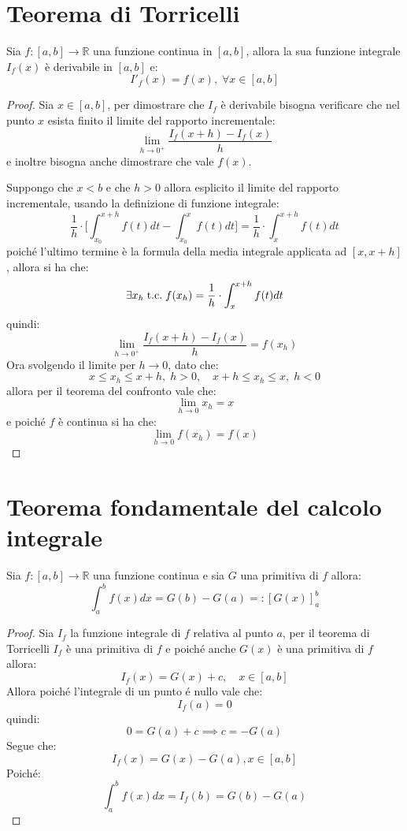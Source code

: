 \documentclass[a4paper,12pt,openright]{book}
\begin{document}
	\newpage
	
	\section{Teorema di Torricelli}
	Sia $f: [a, b] \longrightarrow \mathbb{R}$ una funzione continua in $[a, b]$, allora la sua funzione integrale $I_f(x)$ è derivabile in $[a, b]$ e:
	\[I'_f(x) = f(x), \; \forall x \in [a, b]\]
	
	\begin{proof}
		Sia $x \in [a, b]$, per dimostrare che $I_f$ è derivabile bisogna verificare che nel punto $x$ esista finito il limite del rapporto incrementale:
		\[\lim_{h \to 0^+} \frac{I_f(x + h) - I_f(x)}{h}\]
		e inoltre bisogna anche dimostrare che vale $f(x)$.
		
		Suppongo che $x < b$ e che $h > 0$ allora esplicito il limite del rapporto incrementale, usando la definizione di funzione integrale:
		\[\frac{1}{h} \cdot \big[\int_{x_0}^{x + h} f(t)dt - \int_{x_0}^{x} f(t)dt\big] = \frac{1}{h} \cdot \int_{x}^{x + h} f(t)dt\]
		poiché l'ultimo termine è la formula della media integrale applicata ad $[x, x + h]$, allora si ha che:
		\[\exists x_h \;\text{t.c.}\; f(x_h) = \frac{1}{h} \cdot \int_{x}^{x + h} f(t)dt\]
		quindi:
		\[\lim_{h \to 0^+} \frac{I_f(x + h) - I_f(x)}{h} = f(x_h)\]
		Ora svolgendo il limite per $h \to 0$, dato che:
		\[x \leq x_h \leq x + h, \; h > 0, \quad x + h \leq x_h \leq x, \; h < 0\]
		allora per il teorema del confronto vale che:
		\[\lim_{h \to 0} x_h = x\]
		e poiché $f$ è continua si ha che:
		\[\lim_{h \to 0} f(x_h) = f(x)\]
	\end{proof}
	
	\newpage
	
	\section{Teorema fondamentale del calcolo integrale}
	Sia $f: [a, b] \longrightarrow \mathbb{R}$ una funzione continua e sia $G$ una primitiva di $f$ allora:
	\[\int_{a}^{b} f(x)dx = G(b) - G(a) =: [G(x)]_a^b\]
	
	\begin{proof}
		Sia $I_f$ la funzione integrale di $f$ relativa al punto $a$, per il teorema di Torricelli $I_f$ è una primitiva di $f$ e poiché anche $G(x)$ è una primitiva di $f$ allora:
		\[I_f(x) = G(x) + c, \quad x \in [a, b]\]
		Allora poiché l'integrale di un punto é nullo vale che:
		\[I_f(a) = 0\]
		quindi:
		\[0 = G(a) + c \implies c = -G(a)\]
		Segue che:
		\[I_f(x) = G(x) - G(a), x \in [a, b]\]
		Poiché:
		\[\int_{a}^{b} f(x)dx = I_f(b) = G(b) - G(a)\]
	\end{proof}
 	
\end{document}
